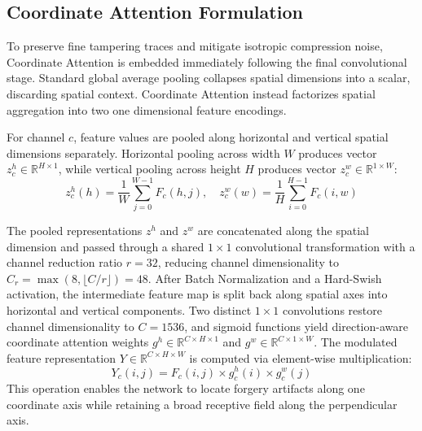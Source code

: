 \documentclass[conference]{IEEEtran}
\begin{document}
\subsection{Coordinate Attention Formulation}
To preserve fine tampering traces and mitigate isotropic compression noise, Coordinate Attention is embedded immediately following the final convolutional stage. Standard global average pooling collapses spatial dimensions into a scalar, discarding spatial context. Coordinate Attention instead factorizes spatial aggregation into two one dimensional feature encodings.

For channel $c$, feature values are pooled along horizontal and vertical spatial dimensions separately. Horizontal pooling across width $W$ produces vector $z_c^h \in \mathbb{R}^{H \times 1}$, while vertical pooling across height $H$ produces vector $z_c^w \in \mathbb{R}^{1 \times W}$:
\begin{equation}
z_c^h(h) = \frac{1}{W} \sum_{j=0}^{W-1} F_c(h, j), \quad z_c^w(w) = \frac{1}{H} \sum_{i=0}^{H-1} F_c(i, w)
\end{equation}

The pooled representations $z^h$ and $z^w$ are concatenated along the spatial dimension and passed through a shared $1 \times 1$ convolutional transformation with a channel reduction ratio $r = 32$, reducing channel dimensionality to $C_r = \max(8, \lfloor C/r \rfloor) = 48$. After Batch Normalization and a Hard-Swish activation, the intermediate feature map is split back along spatial axes into horizontal and vertical components. Two distinct $1 \times 1$ convolutions restore channel dimensionality to $C = 1536$, and sigmoid functions yield direction-aware coordinate attention weights $g^h \in \mathbb{R}^{C \times H \times 1}$ and $g^w \in \mathbb{R}^{C \times 1 \times W}$. The modulated feature representation $Y \in \mathbb{R}^{C \times H \times W}$ is computed via element-wise multiplication:
\begin{equation}
Y_c(i, j) = F_c(i, j) \times g_c^h(i) \times g_c^w(j)
\end{equation}
This operation enables the network to locate forgery artifacts along one coordinate axis while retaining a broad receptive field along the perpendicular axis.
\end{document}
